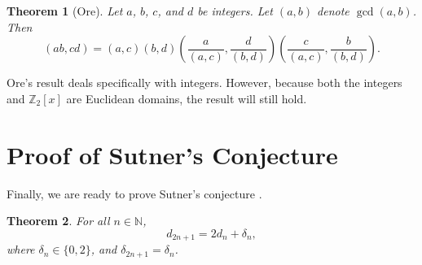 \documentclass[a4paper]{article}
\newtheorem{theorem}{Theorem}
\newcommand{\Z}{\mathbb{Z}}
\newcommand{\N}{\mathbb{N}}
\begin{document}
	\begin{theorem}[Ore]\label{Ore_gcd}
		Let $a$, $b$, $c$, and $d$ be integers.
		Let $(a,b)$ denote $\gcd{(a,b)}$.
		Then
		\begin{equation*}
			(ab,cd) = (a,c)(b,d)\left(\frac{a}{(a,c)},\frac{d}{(b,d)}\right)\left(\frac{c}{(a,c)},\frac{b}{(b,d)}\right).
		\end{equation*}
	\end{theorem}

	Ore's result deals specifically with integers.
	However, because both the integers and $\Z_2[x]$ are Euclidean domains, the result will still hold.

	\section{Proof of Sutner's Conjecture}
	Finally, we are ready to prove Sutner's conjecture \cite{Sutner1989}. 
	\begin{theorem}
		For all $n \in \N$,
		\begin{equation*}
			d_{2n+1} = 2d_n + \delta_n,
		\end{equation*}
		where $\delta_n \in \{0,2\}$, and $\delta_{2n+1} = \delta_n$.
	\end{theorem}
\end{document}
